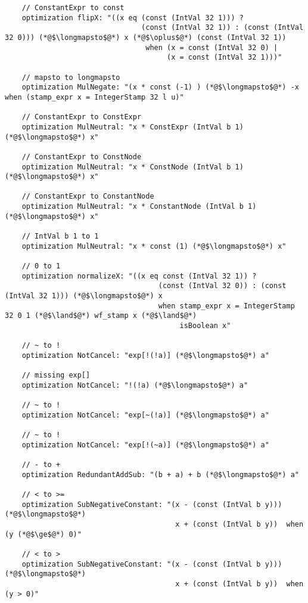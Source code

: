 \begin{appendices}
\begin{lstlisting}
    // ConstantExpr to const
    optimization flipX: "((x eq (const (IntVal 32 1))) ? 
                                (const (IntVal 32 1)) : (const (IntVal 32 0))) (*@$\longmapsto$@*) x (*@$\oplus$@*) (const (IntVal 32 1))
                                 when (x = const (IntVal 32 0) | 
                                      (x = const (IntVal 32 1)))" 
                    
    // mapsto to longmapsto
    optimization MulNegate: "(x * const (-1) ) (*@$\longmapsto$@*) -x when (stamp_expr x = IntegerStamp 32 l u)" 
    
    // ConstantExpr to ConstExpr
    optimization MulNeutral: "x * ConstExpr (IntVal b 1) (*@$\longmapsto$@*) x" 

    // ConstantExpr to ConstNode
    optimization MulNeutral: "x * ConstNode (IntVal b 1) (*@$\longmapsto$@*) x" 

    // ConstantExpr to ConstantNode
    optimization MulNeutral: "x * ConstantNode (IntVal b 1) (*@$\longmapsto$@*) x" 

    // IntVal b 1 to 1
    optimization MulNeutral: "x * const (1) (*@$\longmapsto$@*) x" 

    // 0 to 1
    optimization normalizeX: "((x eq const (IntVal 32 1)) ? 
                                    (const (IntVal 32 0)) : (const (IntVal 32 1))) (*@$\longmapsto$@*) x
                                    when stamp_expr x = IntegerStamp 32 0 1 (*@$\land$@*) wf_stamp x (*@$\land$@*)
                                         isBoolean x" 

    // ~ to !
    optimization NotCancel: "exp[!(!a)] (*@$\longmapsto$@*) a" 

    // missing exp[]
    optimization NotCancel: "!(!a) (*@$\longmapsto$@*) a" 

    // ~ to !
    optimization NotCancel: "exp[~(!a)] (*@$\longmapsto$@*) a" 

    // ~ to !
    optimization NotCancel: "exp[!(~a)] (*@$\longmapsto$@*) a" 

    // - to +
    optimization RedundantAddSub: "(b + a) + b (*@$\longmapsto$@*) a" 

    // < to >=
    optimization SubNegativeConstant: "(x - (const (IntVal b y))) (*@$\longmapsto$@*) 
                                        x + (const (IntVal b y))  when (y (*@$\ge$@*) 0)"  
        
    // < to >
    optimization SubNegativeConstant: "(x - (const (IntVal b y))) (*@$\longmapsto$@*) 
                                        x + (const (IntVal b y))  when (y > 0)"  


\end{lstlisting}
\end{appendices}
